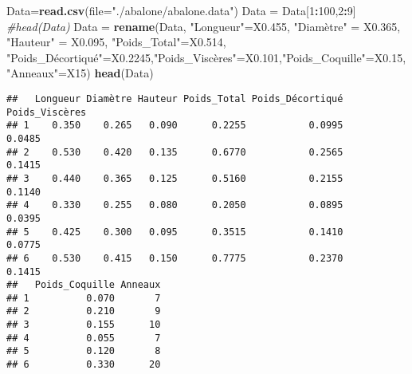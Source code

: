 \documentclass[
]{article}
\newenvironment{Shaded}{\begin{snugshade}}{\end{snugshade}}
\newcommand{\AttributeTok}[1]{\textcolor[rgb]{0.13,0.29,0.53}{#1}}
\newcommand{\CommentTok}[1]{\textcolor[rgb]{0.56,0.35,0.01}{\textit{#1}}}
\newcommand{\DecValTok}[1]{\textcolor[rgb]{0.00,0.00,0.81}{#1}}
\newcommand{\FunctionTok}[1]{\textcolor[rgb]{0.13,0.29,0.53}{\textbf{#1}}}
\newcommand{\NormalTok}[1]{#1}
\newcommand{\OtherTok}[1]{\textcolor[rgb]{0.56,0.35,0.01}{#1}}
\newcommand{\SpecialCharTok}[1]{\textcolor[rgb]{0.81,0.36,0.00}{\textbf{#1}}}
\newcommand{\StringTok}[1]{\textcolor[rgb]{0.31,0.60,0.02}{#1}}
\begin{document}
\begin{Shaded}
\begin{Highlighting}[]
\NormalTok{Data}\OtherTok{=}\FunctionTok{read.csv}\NormalTok{(}\AttributeTok{file=}\StringTok{"./abalone/abalone.data"}\NormalTok{)}
\NormalTok{Data }\OtherTok{=}\NormalTok{ Data[}\DecValTok{1}\SpecialCharTok{:}\DecValTok{100}\NormalTok{,}\DecValTok{2}\SpecialCharTok{:}\DecValTok{9}\NormalTok{]}
\CommentTok{\#head(Data)}
\NormalTok{Data }\OtherTok{=} \FunctionTok{rename}\NormalTok{(Data, }\StringTok{"Longueur"}\OtherTok{=}\StringTok{\textasciigrave{}}\AttributeTok{X0.455}\StringTok{\textasciigrave{}}\NormalTok{, }\StringTok{"Diamètre"} \OtherTok{=} \StringTok{\textasciigrave{}}\AttributeTok{X0.365}\StringTok{\textasciigrave{}}\NormalTok{, }\StringTok{"Hauteur"} \OtherTok{=} \StringTok{\textasciigrave{}}\AttributeTok{X0.095}\StringTok{\textasciigrave{}}\NormalTok{, }\StringTok{"Poids\_Total"}\OtherTok{=}\StringTok{\textasciigrave{}}\AttributeTok{X0.514}\StringTok{\textasciigrave{}}\NormalTok{, }\StringTok{"Poids\_Décortiqué"}\OtherTok{=}\StringTok{\textasciigrave{}}\AttributeTok{X0.2245}\StringTok{\textasciigrave{}}\NormalTok{,}\StringTok{"Poids\_Viscères"}\OtherTok{=}\StringTok{\textasciigrave{}}\AttributeTok{X0.101}\StringTok{\textasciigrave{}}\NormalTok{,}\StringTok{"Poids\_Coquille"}\OtherTok{=}\StringTok{\textasciigrave{}}\AttributeTok{X0.15}\StringTok{\textasciigrave{}}\NormalTok{, }\StringTok{"Anneaux"}\OtherTok{=}\StringTok{\textasciigrave{}}\AttributeTok{X15}\StringTok{\textasciigrave{}}\NormalTok{)}
\FunctionTok{head}\NormalTok{(Data)}
\end{Highlighting}
\end{Shaded}

\begin{verbatim}
##   Longueur Diamètre Hauteur Poids_Total Poids_Décortiqué Poids_Viscères
## 1    0.350    0.265   0.090      0.2255           0.0995         0.0485
## 2    0.530    0.420   0.135      0.6770           0.2565         0.1415
## 3    0.440    0.365   0.125      0.5160           0.2155         0.1140
## 4    0.330    0.255   0.080      0.2050           0.0895         0.0395
## 5    0.425    0.300   0.095      0.3515           0.1410         0.0775
## 6    0.530    0.415   0.150      0.7775           0.2370         0.1415
##   Poids_Coquille Anneaux
## 1          0.070       7
## 2          0.210       9
## 3          0.155      10
## 4          0.055       7
## 5          0.120       8
## 6          0.330      20
\end{verbatim}
\end{document}
